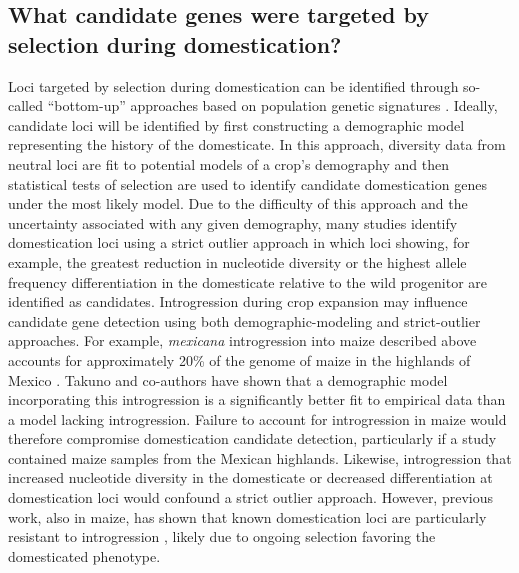 \documentclass[11pt]{article}
\newcommand{\lwang}[1]{\textcolor{red}{ \emph{\scriptsize  #1}} } %
\begin{document}
\subsection*{What candidate genes were targeted by selection during domestication?}
Loci targeted by selection during domestication can be identified through so-called ``bottom-up'' approaches based on population genetic signatures \cite{Ross-Ibarra2007}.
Ideally, candidate loci will be identified by first constructing a demographic model representing the history of the domesticate.
In this approach, diversity data from neutral loci are fit to potential models of a crop's demography and then statistical tests of selection are used to identify candidate domestication genes under the most likely model.
Due to the difficulty of this approach and the uncertainty associated with any given demography, many studies identify domestication loci using a strict outlier approach in which loci showing, for example, the greatest reduction in nucleotide diversity or the highest allele frequency differentiation in the domesticate relative to the wild progenitor are identified as candidates.
Introgression during crop expansion may influence candidate gene detection using both demographic-modeling and strict-outlier approaches.
For example, \emph{mexicana} introgression into maize described above accounts for approximately 20\% of the genome of maize in the highlands of Mexico \cite{vanHeerwaarden2011}.
Takuno and co-authors \cite{Takuno2015} have shown that a demographic model incorporating this introgression is a significantly better fit to empirical data than a model lacking introgression.
Failure to account for introgression in maize would therefore compromise domestication candidate detection, particularly if a study contained maize samples from the Mexican highlands.
Likewise, introgression that increased nucleotide diversity in the domesticate or decreased differentiation at domestication loci would confound a strict outlier approach.
However, previous work, also in maize, has shown that known domestication loci are particularly resistant to introgression \cite{Hufford2013}, likely due to ongoing selection favoring the domesticated phenotype.

\end{document}
